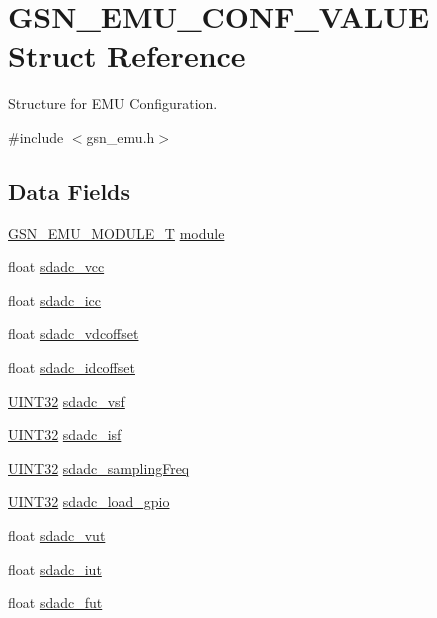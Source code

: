\hypertarget{a00058}{
\section{GSN\_\-EMU\_\-CONF\_\-VALUE Struct Reference}
\label{a00058}
}


Structure for EMU Configuration.  




{\ttfamily \#include $<$gsn\_\-emu.h$>$}

\subsection*{Data Fields}
\begin{DoxyCompactItemize}
\item 
\hyperlink{a00663_ga080611b90847f38e9ac1972093fdef77}{GSN\_\-EMU\_\-MODULE\_\-T} \hyperlink{a00058_ac53553166c6760a06ffb7d10be44b054}{module}
\item 
float \hyperlink{a00058_a53c7ccdbdaf6172d03fdd9b1a0f89f87}{sdadc\_\-vcc}
\item 
float \hyperlink{a00058_ac612b6ab67ea263b3483813f9b2c9637}{sdadc\_\-icc}
\item 
float \hyperlink{a00058_a1f0888134ba8ec9b9f4aba86affe7f92}{sdadc\_\-vdcoffset}
\item 
float \hyperlink{a00058_a852ece992b3a45bf11166b4c5cc23287}{sdadc\_\-idcoffset}
\item 
\hyperlink{a00660_gae1e6edbbc26d6fbc71a90190d0266018}{UINT32} \hyperlink{a00058_a1df73737dd7e55463686398514031c48}{sdadc\_\-vsf}
\item 
\hyperlink{a00660_gae1e6edbbc26d6fbc71a90190d0266018}{UINT32} \hyperlink{a00058_ac6f34dcb9689e22a9c0634bb0d2c99a2}{sdadc\_\-isf}
\item 
\hyperlink{a00660_gae1e6edbbc26d6fbc71a90190d0266018}{UINT32} \hyperlink{a00058_a254e10a60087479de44dc5064253efac}{sdadc\_\-samplingFreq}
\item 
\hyperlink{a00660_gae1e6edbbc26d6fbc71a90190d0266018}{UINT32} \hyperlink{a00058_add03215b65f178ef10b3a8683a4d1511}{sdadc\_\-load\_\-gpio}
\item 
float \hyperlink{a00058_a5be38a8bca520ac56073318cb93607dc}{sdadc\_\-vut}
\item 
float \hyperlink{a00058_afd683a03afa22535af11ffb7a7264fdf}{sdadc\_\-iut}
\item 
float \hyperlink{a00058_a83a087ad5c26cd2feb06c906f5638d9e}{sdadc\_\-fut}
\item 

\end{DoxyCompactItemize}
